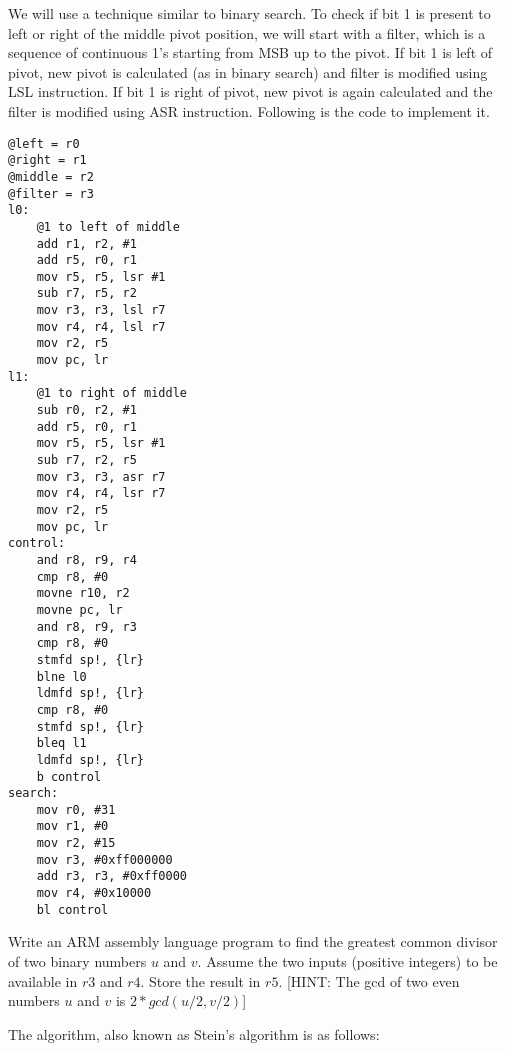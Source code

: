\begin{ExerciseList}
\Answer
We will use a technique similar to binary search. To check if bit 1 is present to left or right of the middle pivot position, we will start with a filter, which is a sequence of continuous 1's starting from MSB up to the pivot. If bit 1 is left of pivot, new pivot is calculated (as in binary search) and filter is modified using LSL instruction. If bit 1 is right of pivot, new pivot is again calculated and the filter is modified using ASR instruction. Following is the code to implement it.
\begin{Verbatim}[frame=single]
@left = r0
@right = r1
@middle = r2
@filter = r3
l0: 
	@1 to left of middle
	add r1, r2, #1
	add r5, r0, r1
	mov r5, r5, lsr #1
	sub r7, r5, r2
	mov r3, r3, lsl r7
	mov r4, r4, lsl r7
	mov r2, r5
	mov pc, lr
l1:
	@1 to right of middle
	sub r0, r2, #1
	add r5, r0, r1
	mov r5, r5, lsr #1
	sub r7, r2, r5
	mov r3, r3, asr r7
	mov r4, r4, lsr r7
	mov r2, r5
	mov pc, lr
control:
	and r8, r9, r4
	cmp r8, #0
	movne r10, r2
	movne pc, lr
	and r8, r9, r3
	cmp r8, #0
	stmfd sp!, {lr}
	blne l0
	ldmfd sp!, {lr}
	cmp r8, #0
	stmfd sp!, {lr}
	bleq l1
	ldmfd sp!, {lr}
	b control
search:
	mov r0, #31
	mov r1, #0
	mov r2, #15
	mov r3, #0xff000000
	add r3, r3, #0xff0000
	mov r4, #0x10000
	bl control
\end{Verbatim}




\Exercise[difficulty=3]
Write an ARM assembly language program to find the greatest common divisor of two binary numbers $u$ and $v$.
Assume the two inputs (positive integers) 
to be available in $r3$ and $r4$. Store the result in $r5$.
[HINT: The gcd of two even numbers $u$ and $v$ is $2*gcd(u/2,v/2)$]

\Answer
The algorithm, also known as Stein's algorithm is as follows:


\end{ExerciseList}
